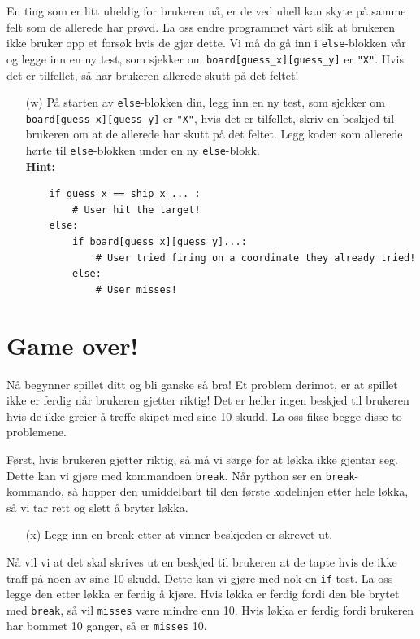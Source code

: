 \documentclass[a4paper, 11pt, notitlepage]{article}
\begin{document}
En ting som er litt uheldig for brukeren nå, er de ved uhell kan skyte på samme felt som de allerede har prøvd. La oss endre programmet vårt slik at brukeren ikke bruker opp et forsøk hvis de gjør dette. Vi må da gå inn i \verb+else+-blokken vår og legge inn en ny test, som sjekker om \verb+board[guess_x][guess_y]+ er \verb+"X"+. Hvis det er tilfellet, så har brukeren allerede skutt på det feltet!
\begin{itemize}
	\item[(w)] På starten av \verb+else+-blokken din, legg inn en ny test, som sjekker om \verb+board[guess_x][guess_y]+ er \verb+"X"+, hvis det er tilfellet, skriv en beskjed til brukeren om at de allerede har skutt på det feltet. Legg koden som allerede hørte til \verb+else+-blokken under en ny \verb+else+-blokk. \\ \textbf{Hint:}
	\begin{lstlisting}
	if guess_x == ship_x ... :
		# User hit the target!
	else:
		if board[guess_x][guess_y]...:
			# User tried firing on a coordinate they already tried!
		else:
			# User misses!
	\end{lstlisting}
\end{itemize}

\section*{Game over!}

Nå begynner spillet ditt og bli ganske så bra! Et problem derimot, er at spillet ikke er ferdig når brukeren gjetter riktig! Det er heller ingen beskjed til brukeren hvis de ikke greier å treffe skipet med sine 10 skudd. La oss fikse begge disse to problemene.

Først, hvis brukeren gjetter riktig, så må vi sørge for at løkka ikke gjentar seg. Dette kan vi gjøre med kommandoen \verb+break+. Når python ser en \verb+break+-kommando, så hopper den umiddelbart til den første kodelinjen etter hele løkka, så vi tar rett og slett å bryter løkka.
\begin{itemize}
\item[(x)] Legg inn en break etter at vinner-beskjeden er skrevet ut.
\end{itemize}

Nå vil vi at det skal skrives ut en beskjed til brukeren at de tapte hvis de ikke traff på noen av sine 10 skudd. Dette kan vi gjøre med nok en \verb+if+-test. La oss legge den etter løkka er ferdig å kjøre. Hvis løkka er ferdig fordi den ble brytet med \verb+break+, så vil \verb+misses+ være mindre enn 10. Hvis løkka er ferdig fordi brukeren har bommet 10 ganger, så er \verb+misses+ 10. 
\end{document}
